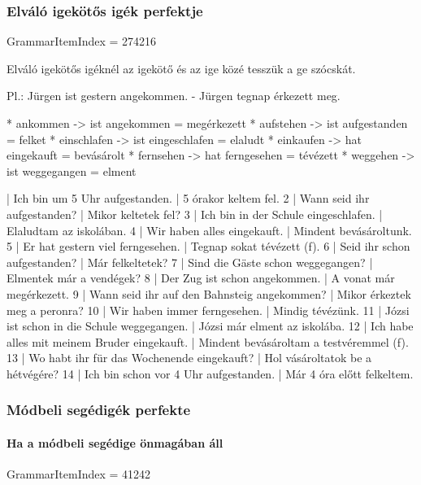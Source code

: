 \documentclass{article}
\newenvironment{desc}{\verbatim}{\endverbatim}
\newenvironment{exmp}{\verbatim}{\endverbatim}
\begin{document}
\subsubsection{Elváló igekötős igék perfektje}

GrammarItemIndex = 274216

\begin{desc}
Elváló igekötős igéknél az igekötő és az ige közé tesszük a ge szócskát.

Pl.: Jürgen ist gestern angekommen. - Jürgen tegnap érkezett meg.

* ankommen -> ist angekommen = megérkezett
* aufstehen -> ist aufgestanden = felket
* einschlafen -> ist eingeschlafen = elaludt
* einkaufen -> hat eingekauft = bevásárolt
* fernsehen -> hat ferngesehen = tévézett
* weggehen -> ist weggegangen = elment
\end{desc}

\begin{exmp}
1 | Ich bin um 5 Uhr aufgestanden. | 5 órakor keltem fel.
2 | Wann seid ihr aufgestanden? | Mikor keltetek fel?
3 | Ich bin in der Schule eingeschlafen. | Elaludtam az iskolában.
4 | Wir haben alles eingekauft. | Mindent bevásároltunk.
5 | Er hat gestern viel ferngesehen. | Tegnap sokat tévézett (f).
6 | Seid ihr schon aufgestanden? | Már felkeltetek?
7 | Sind die Gäste schon weggegangen? | Elmentek már a vendégek?
8 | Der Zug ist schon angekommen. | A vonat már megérkezett.
9 | Wann seid ihr auf den Bahnsteig angekommen? | Mikor érkeztek meg a peronra?
10 | Wir haben immer ferngesehen. | Mindig tévézünk.
11 | Józsi ist schon in die Schule weggegangen. | Józsi már elment az iskolába.
12 | Ich habe alles mit meinem Bruder eingekauft. | Mindent bevásároltam a testvéremmel (f).
13 | Wo habt ihr für das Wochenende eingekauft? | Hol vásároltatok be a hétvégére?
14 | Ich bin schon vor 4 Uhr aufgestanden. | Már 4 óra előtt felkeltem.
\end{exmp}

\subsubsection{Módbeli segédigék perfekte}

\paragraph{Ha a módbeli segédige önmagában áll}

GrammarItemIndex = 41242
\end{document}
